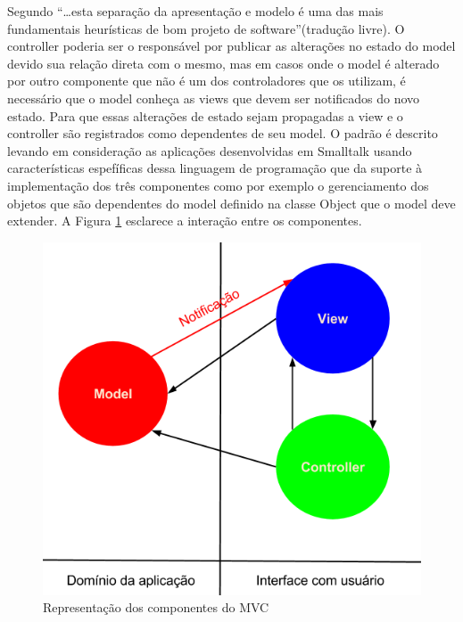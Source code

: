 \documentclass[conference]{IEEEtran}
\begin{document}
Segundo  ``\ldots esta separação da
apresentação e modelo é uma das mais fundamentais heurísticas de bom projeto
de software''(tradução livre).
O controller poderia ser o responsável por publicar as alterações no estado do
model devido sua relação direta com o mesmo, mas em casos onde o model é
alterado por outro componente que não é um dos controladores que os utilizam, é
necessário que o model conheça as views que devem ser notificados do novo
estado. Para que essas alterações de estado sejam propagadas a view e o
controller são registrados como dependentes de seu model. O padrão é descrito
levando em consideração as aplicações desenvolvidas em Smalltalk usando
características espefíficas dessa linguagem de programação que da suporte à
implementação dos três componentes como por exemplo o gerenciamento dos objetos
que são dependentes do model definido na classe Object que o model deve
extender. A Figura \ref{mvc} esclarece a interação entre os componentes.

\begin{figure}[htb]
	\begin{center}
		\includegraphics[scale=0.5]{img/mvc.png}
	\end{center}
	
	\caption{\label{mvc}Representação dos componentes do MVC}
\end{figure}
\end{document}
